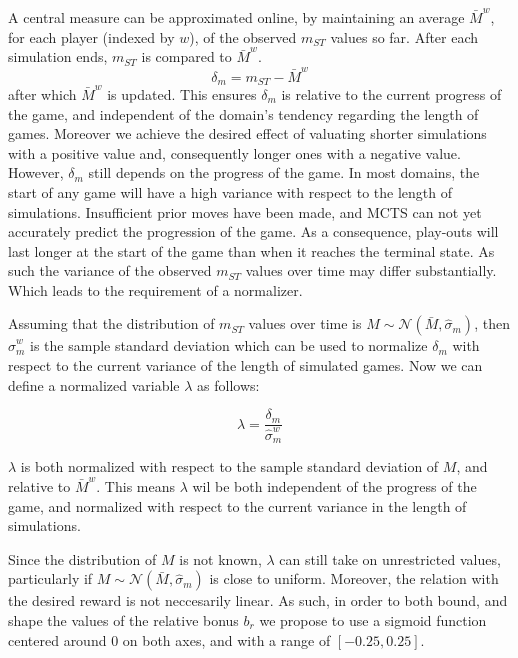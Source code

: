 \documentclass{ecai2010}
\begin{document}
A central measure can be approximated online, by maintaining an average $\bar{M}^w$, for each player (indexed by $w$), of the observed $m_{ST}$ values so far. After each simulation ends, $m_{ST}$ is compared to $\bar{M}^w$. 
\begin{equation}
\delta_m = m_{ST} - \bar{M}^w
\end{equation}
after which $\bar{M}^w$ is updated. This ensures $\delta_m$ is relative to the current progress of the game, and independent of the domain's tendency regarding the length of games. Moreover we achieve the desired effect of valuating shorter simulations with a positive value and, consequently longer ones with a negative value. However, $\delta_m$ still depends on the progress of the game. In most domains, the start of any game will have a high variance with respect to the length of simulations. Insufficient prior moves have been made, and MCTS can not yet accurately predict the progression of the game. As a consequence, play-outs will last longer at the start of the game than when it reaches the terminal state. As such the variance of the observed $m_{ST}$ values over time may differ substantially. Which leads to the requirement of a normalizer.

Assuming that the distribution of $m_{ST}$ values over time is $M \sim \mathcal{N}(\bar{M}, \hat{\sigma}_m)$, then $\hat{\sigma}^w_m$ is the sample standard deviation which can be used to normalize $\delta_m$ with respect to the current variance of the length of simulated games. Now we can define a normalized variable $\lambda$ as follows:

\begin{equation}
\lambda = \frac{\delta_m}{\hat{\sigma}^w_m}
\end{equation}

$\lambda$ is both normalized with respect to the sample standard deviation of $M$, and relative to $\bar{M}^w$. This means $\lambda$ wil be both independent of the progress of the game, and normalized with respect to the current variance in the length of simulations.

Since the distribution of $M$ is not known, $\lambda$ can still take on unrestricted values, particularly if $M \sim \mathcal{N}(\bar{M}, \hat{\sigma}_m)$ is close to uniform. Moreover, the relation with the desired reward is not neccesarily linear. As such, in order to both bound, and shape the values of the relative bonus $b_r$ we propose to use a sigmoid function centered around $0$ on both axes, and with a range of $[-0.25, 0.25]$.
\end{document}
